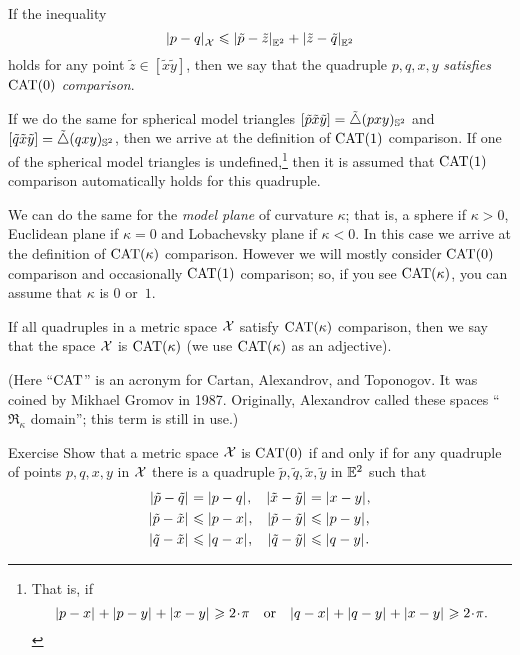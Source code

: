 If the inequality
\[\dist{p}{q}{\spc{X}}\le \dist{\tilde p}{\tilde z}{\EE^2}+\dist{\tilde z}{\tilde q}{\EE^2}\]
holds for any point $\tilde z\in [\tilde x\tilde y]$, then we say that 
the quadruple $p,q,x,y$ \emph{satisfies $\mathrm{CAT}(0)$ comparison}.
\label{page:CAT-comparison}


If we do the same for spherical model triangles  
$[\tilde p\tilde x\tilde y]=\tilde\triangle{}(pxy)_{\mathbb{S}^2}$ 
and 
$[\tilde q\tilde x\tilde y]=\tilde\triangle{}(qxy)_{\mathbb{S}^2}$,
then we arrive at the definition of $\mathrm{CAT}(1)$ comparison.
If one of the spherical model triangles is undefined,\footnote{That is, if 
\[\dist{p}{x}{}+\dist{p}{y}{}+\dist{x}{y}{}\ge 2\cdot\pi
\quad
\text{or}
\quad
\dist{q}{x}{}+\dist{q}{y}{}+\dist{x}{y}{}\ge 2\cdot\pi.\]}
then it is assumed that $\mathrm{CAT}(1)$ comparison automatically holds for this quadruple.

We can do the same for the \emph{model plane} of curvature $\kappa$;
that is, a sphere if $\kappa>0$, 
Euclidean plane if $\kappa=0$ 
and Lobachevsky plane if $\kappa<0$.
In this case we arrive at the definition of $\mathrm{CAT}(\kappa)$ comparison.
However we will mostly consider $\mathrm{CAT}(0)$ comparison and occasionally $\mathrm{CAT}(1)$ comparison;
so, if you see $\mathrm{CAT}(\kappa)$, you can assume that $\kappa$ is $0$ or~$1$.

If all quadruples in a metric space $\mathcal{X}$ satisfy $\mathrm{CAT}(\kappa)$ comparison, then we say that the space $\mathcal{X}$ is $\mathrm{CAT}(\kappa)$
(we use $\mathrm{CAT}(\kappa)$ as an adjective).

(Here ``$\mathrm{CAT}$'' is an acronym for Cartan, Alexandrov, and Toponogov.
It was coined by Mikhael Gromov in 1987.
Originally, Alexandrov called these spaces ``$\mathfrak{R}_\kappa$ domain'';
this term is still in use.)

\begin{thm}{Exercise}\label{ex:sba-2+2-short}
Show that a metric space $\mathcal{X}$ is $\mathrm{CAT}(0)$
if and only if for any quadruple of points 
$p,q,x,y$ in $\mathcal{X}$ 
there is a quadruple $\tilde p,\tilde q,\tilde x,\tilde y$ in $\mathbb{E}^2$
such that 
\begin{align*}
\dist{\tilde p}{\tilde q}{}&=\dist{p}{q}{},
&
\dist{\tilde x}{\tilde y}{}&=\dist{x}{y}{},
\\
\dist{\tilde p}{\tilde x}{}&\le \dist{p}{x}{},
&
\dist{\tilde p}{\tilde y}{}&\le \dist{p}{y}{},
\\
\dist{\tilde q}{\tilde x}{}&\le \dist{q}{x}{},
&
\dist{\tilde q}{\tilde y}{}&\le \dist{q}{y}{}.
\end{align*}

\end{thm}


